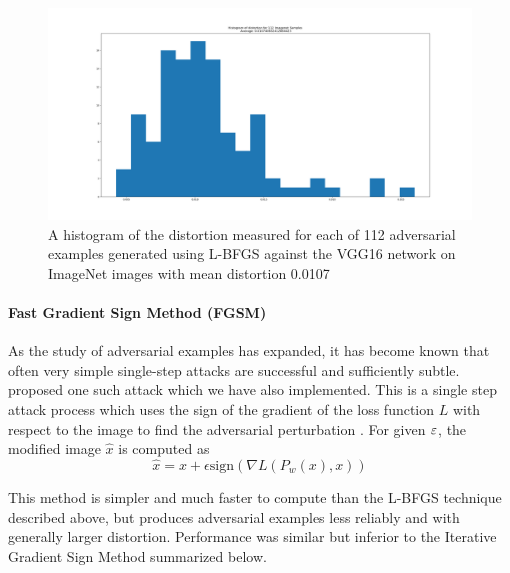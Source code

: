 
\begin{figure}[H]
\label{lbfgsi}
\includegraphics[trim=200 80 100 100, clip,width=14cm]{c1_figures/distortion_hist.png}
\caption{A histogram of the distortion measured for each of 112 adversarial examples generated using L-BFGS against the VGG16 network on ImageNet images with mean distortion 0.0107}
\end{figure}

\paragraph{Fast Gradient Sign Method (FGSM)} 

As the study of adversarial examples has expanded, it has become known
that often very simple single-step attacks are successful and
sufficiently subtle. ~\citet{goodfellow_explaining_2014} proposed one
such attack which we have also implemented. This is a single step
attack process which uses the sign of the gradient of the loss
function $L$  with respect to the image to find the adversarial
perturbation . For given $\varepsilon$, the modified  image $\hat x$ is
computed as 
\begin{equation}
\hat{x} = x + \epsilon \text{sign} (\nabla L (P_w(x),x))
\end{equation}

This method is simpler and much faster to compute than the L-BFGS technique described above, but produces adversarial examples less reliably and with generally larger distortion. Performance was similar but inferior to the Iterative Gradient Sign Method summarized below.  

